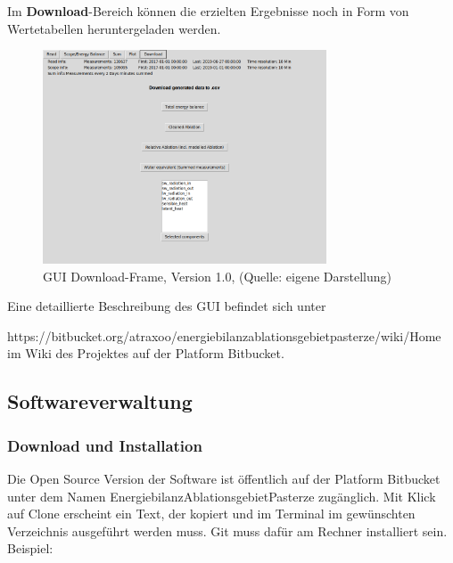 \documentclass[11pt,a4paper]{article}
\newcommand{\guiplotsize}{0.75}
\newcommand{\guiversion}{1.0}
\begin{document}
Im \textbf{Download}-Bereich können die erzielten Ergebnisse noch in Form von Wertetabellen heruntergeladen werden.

\begin{figure}[H]
\centering
\includegraphics[width=\guiplotsize\textwidth]{pictures/GUI/Download_Frame.png}
\caption[GUI Download-Frame, Version \guiversion]{GUI Download-Frame, Version \guiversion, (Quelle: eigene Darstellung)}
\label{fig:GUI Download-Frame}
\end{figure}

Eine detaillierte Beschreibung des GUI befindet sich unter

\textsf{\small https://bitbucket.org/atraxoo/energiebilanzablationsgebietpasterze/wiki/Home}
 im Wiki des Projektes auf der Platform Bitbucket.


\subsection{Softwareverwaltung}
\subsubsection{Download und Installation}
Die Open Source Version der Software ist öffentlich auf der  Platform Bitbucket unter dem Namen EnergiebilanzAblationsgebietPasterze zugänglich. Mit Klick auf Clone erscheint ein Text, der kopiert und im Terminal im gewünschten Verzeichnis ausgeführt werden muss. Git muss dafür am Rechner installiert sein.\\

Beispiel:
\end{document}
